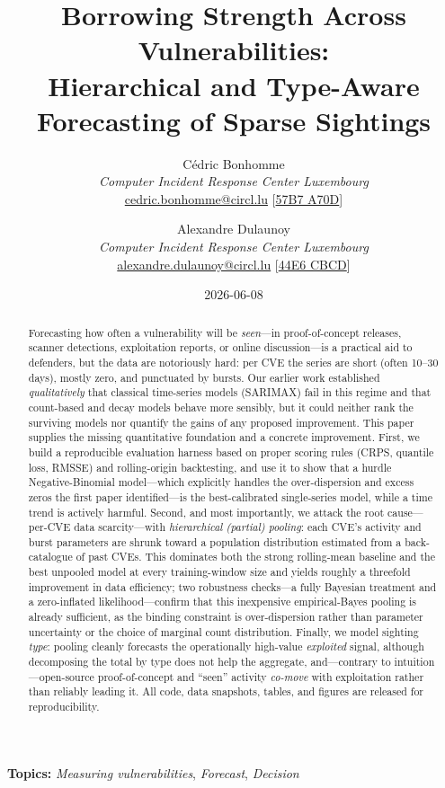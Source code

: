 \documentclass[]{article}
\title{\textbf{Borrowing Strength Across Vulnerabilities:\\ Hierarchical and Type-Aware Forecasting of Sparse Sightings}}
\author{
    Cédric Bonhomme \\
    \textit{Computer Incident Response Center Luxembourg} \\
    \href{mailto:cedric.bonhomme@circl.lu}{cedric.bonhomme@circl.lu} [\href{https://openpgp.circl.lu/pks/lookup?op=get\&search=0xA1CB94DE57B7A70D}{57B7 A70D}]
    \and
    Alexandre Dulaunoy \\
    \textit{Computer Incident Response Center Luxembourg} \\
    \href{mailto:alexandre.dulaunoy@circl.lu}{alexandre.dulaunoy@circl.lu} [\href{https://pgp.circl.lu/pks/lookup?op=get\&search=0x3b12dcc282fa29312f5b709a09e2cd4944e6cbcd}{44E6 CBCD}]
}
\date{2026-06-08}
\begin{document}
\maketitle

\begin{abstract}
Forecasting how often a vulnerability will be \emph{seen}---in proof-of-concept
releases, scanner detections, exploitation reports, or online discussion---is a
practical aid to defenders, but the data are notoriously hard: per CVE the series
are short (often 10--30 days), mostly zero, and punctuated by bursts. Our earlier
work \cite{bonhomme2026modeling} established \emph{qualitatively} that classical
time-series models (SARIMAX) fail in this regime and that count-based and decay
models behave more sensibly, but it could neither rank the surviving models nor
quantify the gains of any proposed improvement. This paper supplies the missing
quantitative foundation and a concrete improvement. First, we build a
reproducible evaluation harness based on proper scoring rules (CRPS, quantile
loss, RMSSE) and rolling-origin backtesting, and use it to show that a hurdle
Negative-Binomial model---which explicitly handles the over-dispersion and excess
zeros the first paper identified---is the best-calibrated single-series model,
while a time trend is actively harmful. Second, and most importantly, we attack
the root cause---per-CVE data scarcity---with \emph{hierarchical (partial)
pooling}: each CVE's activity and burst parameters are shrunk toward a population
distribution estimated from a back-catalogue of past CVEs. This dominates both
the strong rolling-mean baseline and the best unpooled model at every
training-window size and yields roughly a threefold improvement in data
efficiency; two robustness checks---a fully Bayesian treatment and a zero-inflated
likelihood---confirm that this inexpensive empirical-Bayes pooling is already
sufficient, as the binding constraint is over-dispersion rather than parameter
uncertainty or the choice of marginal count distribution. Finally, we model
sighting \emph{type}: pooling cleanly forecasts the
operationally high-value \emph{exploited} signal, although decomposing the total
by type does not help the aggregate, and---contrary to intuition---open-source
proof-of-concept and ``seen'' activity \emph{co-move} with exploitation rather
than reliably leading it. All code, data snapshots, tables, and figures are
released for reproducibility.
\end{abstract}

\vspace{1em}
\noindent\textbf{Topics:} \textit{Measuring vulnerabilities}, \textit{Forecast}, \textit{Decision}
\end{document}
